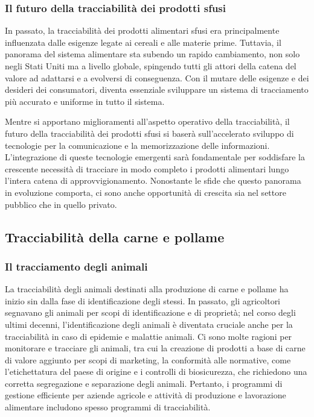 \subsubsection{Il futuro della tracciabilità dei prodotti sfusi}

In passato, la tracciabilità dei prodotti alimentari sfusi era principalmente influenzata dalle esigenze legate ai cereali e alle materie prime. Tuttavia, il panorama del sistema alimentare sta subendo un rapido cambiamento, non solo negli Stati Uniti ma a livello globale, spingendo tutti gli attori della catena del valore ad adattarsi e a evolversi di conseguenza. Con il mutare delle esigenze e dei desideri dei consumatori, diventa essenziale sviluppare un sistema di tracciamento più accurato e uniforme in tutto il sistema.

Mentre si apportano miglioramenti all'aspetto operativo della tracciabilità, il futuro della tracciabilità dei prodotti sfusi si baserà sull'accelerato sviluppo di tecnologie per la comunicazione e la memorizzazione delle informazioni. L'integrazione di queste tecnologie emergenti sarà fondamentale per soddisfare la crescente necessità di tracciare in modo completo i prodotti alimentari lungo l'intera catena di approvvigionamento. Nonostante le sfide che questo panorama in evoluzione comporta, ci sono anche opportunità di crescita sia nel settore pubblico che in quello privato.

\subsection{Tracciabilità della carne e pollame}
\subsubsection{Il tracciamento degli animali}

La tracciabilità degli animali destinati alla produzione di carne e pollame ha inizio sin dalla fase di identificazione degli stessi. In passato, gli agricoltori segnavano gli animali per scopi di identificazione e di proprietà; nel corso degli ultimi decenni, l'identificazione degli animali è diventata cruciale anche per la tracciabilità in caso di epidemie e malattie animali. Ci sono molte ragioni per monitorare e tracciare gli animali, tra cui la creazione di prodotti a base di carne di valore aggiunto per scopi di marketing, la conformità alle normative, come l'etichettatura del paese di origine e i controlli di biosicurezza, che richiedono una corretta segregazione e separazione degli animali. Pertanto, i programmi di gestione efficiente per aziende agricole e attività di produzione e lavorazione alimentare includono spesso programmi di tracciabilità.

